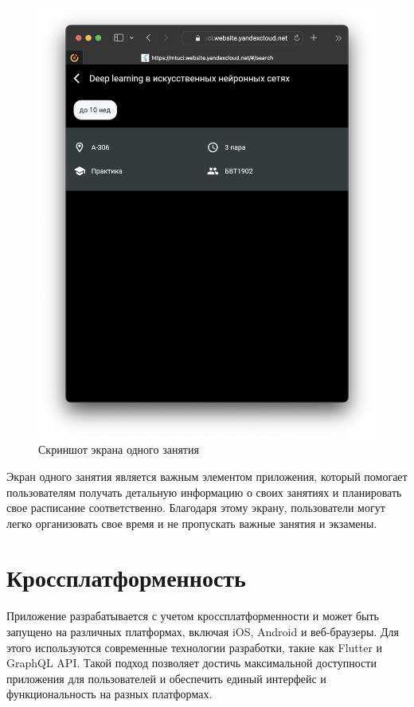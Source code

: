 \begin{figure}[h]
\centering
\includegraphics[width=0.8\linewidth]{images/lesson_screen.png}
\caption{Скриншот экрана одного занятия}
\label{fig:mpr}
\end{figure}

Экран одного занятия является важным элементом приложения,
который помогает пользователям получать детальную информацию
о своих занятиях и планировать свое расписание соответственно.
Благодаря этому экрану, пользователи могут легко организовать
свое время и не пропускать важные занятия и экзамены.

\section{Кроссплатформенность}
Приложение разрабатывается с учетом кроссплатформенности и может быть запущено на различных платформах,
включая iOS, Android и веб-браузеры.
Для этого используются современные технологии разработки, такие как Flutter и GraphQL API.
Такой подход позволяет достичь максимальной доступности приложения для пользователей и обеспечить единый
интерфейс и функциональность на разных платформах.

